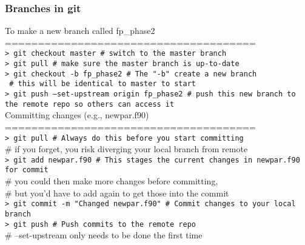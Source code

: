 \subsubsection{Branches in git}

To make a new branch called fp\_phase2
\\
======================================
\\
\texttt{> git checkout master                      \# switch to the master branch}
\\
\texttt{> git pull
                                 \# make sure the master branch is up-to-date
}
\\
\texttt{> git checkout -b fp\_phase2                \# The "-b" create a new branch
}
\\
\texttt{
                                           \#   this will be identical to master to start
}
\\
\texttt{> git push --set-upstream origin fp\_phase2 \# push this new branch to the remote repo so others can access it
}
\\

Committing changes (e.g., newpar.f90)
\\
======================================
\\
\texttt{> git pull                           \# Always do this before you start committing
}
\\
                                     \#   if you forget, you risk diverging your local branch from remote
\\
\texttt{> git add newpar.f90                 \# This stages the current changes in newpar.f90 for commit
}
\\
                                     \#   you could then make more changes before committing,
\\
                                     \#   but you'd have to add again to get those into the commit
\\
\texttt{> git commit -m "Changed newpar.f90" \# Commit changes to your local branch 
}
\\
\texttt{> git push                           \# Push commits to the remote repo
}
\\
                                     \#   --set-upstream only needs to be done the first time
\\

